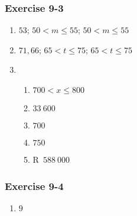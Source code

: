 {\begin{multicols}{3}
\subsubsection*{Exercise 9-3} %

  \begin{enumerate}[noitemsep, label=\textbf{\arabic*}.]

  \item %
$53$; $50<m \leq 55$; $50 < m \leq 55$
  \item %
$71,66$; $65 < t \leq 75$; $65 < t \leq 75$
\item %
\begin{enumerate}[noitemsep, label=\textbf{(\alph*)} ]
\item $700 < x\leq800$%
\item $33~600$%
\item $700$ %
\item $750$%
\item R~$588~000$%
\end{enumerate}

  \end{enumerate}



\subsubsection*{Exercise 9-4} %
  \begin{enumerate}[noitemsep, label=\textbf{\arabic*}.]

  \item $9$%


\end{enumerate}
\end{multicols}}
